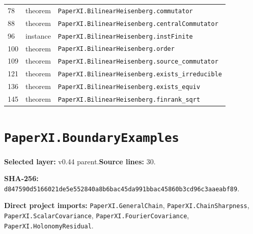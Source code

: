 \documentclass[10pt,oneside]{book}
\begin{document}
\begin{longtable}{@{}p{}p{}p{}@{}}
78&theorem&\nolinkurl{PaperXI.BilinearHeisenberg.commutator}\\

88&theorem&\nolinkurl{PaperXI.BilinearHeisenberg.centralCommutator}\\

96&instance&\nolinkurl{PaperXI.BilinearHeisenberg.instFinite}\\

100&theorem&\nolinkurl{PaperXI.BilinearHeisenberg.order}\\

109&theorem&\nolinkurl{PaperXI.BilinearHeisenberg.source_commutator}\\

121&theorem&\nolinkurl{PaperXI.BilinearHeisenberg.exists_irreducible}\\

136&theorem&\nolinkurl{PaperXI.BilinearHeisenberg.exists_equiv}\\

145&theorem&\nolinkurl{PaperXI.BilinearHeisenberg.finrank_sqrt}\\

\bottomrule\end{longtable}

\section{\texorpdfstring{\nolinkurl{PaperXI.BoundaryExamples}}{PaperXI.BoundaryExamples}}\label{module:PaperXI.BoundaryExamples}

\textbf{Selected layer:} v0.44 parent.\quad\textbf{Source lines:} 30.\par\textbf{SHA-256:} {\scriptsize\nolinkurl{d847590d5166021de5e552840a8b6bac45da991bbac45860b3cd96c3aaeabf89}}.

\textbf{Direct project imports:} \nolinkurl{PaperXI.GeneralChain}, \nolinkurl{PaperXI.ChainSharpness}, \nolinkurl{PaperXI.ScalarCovariance}, \nolinkurl{PaperXI.FourierCovariance}, \nolinkurl{PaperXI.HolonomyResidual}.
\end{document}
